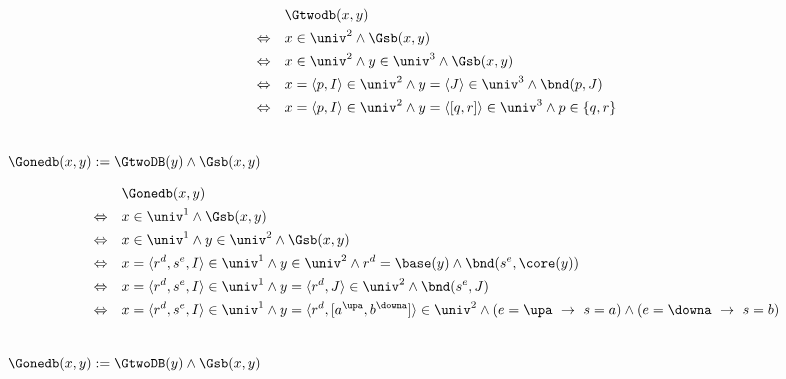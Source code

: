 \begin{hyp}
    \begin{align*}
        &\Gtwodb(x,y)\\
        \Leftrightarrow \quad &x \in \univ^2 \land \Gsb(x,y)\\
        \Leftrightarrow \quad &x \in \univ^2 \land y \in \univ^3 \land \Gsb(x,y)\\
        \Leftrightarrow \quad &x = \langle p, I \rangle \in \univ^2 \land y = \langle J \rangle \in \univ^3 \land \bnd(p, J)\\
        \Leftrightarrow \quad &x = \langle p, I \rangle \in \univ^2 \land y = \langle [q, r] \rangle \in \univ^3 \land p \in \{q,r\}
    \end{align*}
\end{hyp}


\begin{erin}\ \\
    $\Gonedb(x,y) := \GtwoDB(y) \wedge \Gsb(x,y)$
\end{erin}

\begin{hyp}
    \begin{align*}
        &\Gonedb(x,y)\\
        \Leftrightarrow \quad &x \in \univ^1 \land \Gsb(x,y)\\
        \Leftrightarrow \quad &x \in \univ^1 \land y \in \univ^2 \land \Gsb(x,y)\\
        \Leftrightarrow \quad &x = \langle r^d, s^e, I \rangle \in \univ^1 \land y \in \univ^2 \land r^d = \base(y) \land \bnd(s^e, \core(y))\\
        \Leftrightarrow \quad &x = \langle r^d, s^e, I \rangle \in \univ^1 \land y = \langle r^d,J \rangle \in \univ^2 \land \bnd(s^e, J)\\
        \Leftrightarrow \quad &x = \langle r^d, s^e, I \rangle \in \univ^1 \land y = \langle r^d,[a^\upa,b^\downa] \rangle \in \univ^2 \land (e = \upa \ \to\ s = a) \land (e = \downa \ \to\ s = b)
    \end{align*}
\end{hyp}


\begin{erin}\ \\
    $\Gonedb(x,y) := \GtwoDB(y) \wedge \Gsb(x,y)$
\end{erin}

